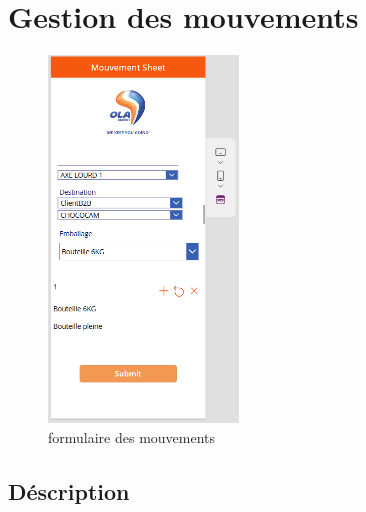 \documentclass[a4paper, oneside, 12pt, final]{extreport}
\begin{document}
\section{Gestion des mouvements}
\begin{figure}[h]
    \centering
    \includegraphics[width=0.45\textwidth]{mv.png} %
    \caption{formulaire des mouvements}
    \label{fig:formulaire des mouvements}
\end{figure}
\subsection{Déscription}
\end{document}
